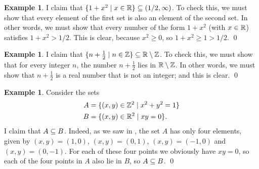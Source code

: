 \documentclass[a4paper]{book}
\theoremstyle{definition}
\newtheorem{example}[theorem]{Example}
\begin{document}
\begin{example}
 I claim that $\{1+x^2\;|\; x\in{\mathbb{R}}\}\subseteq(1/2,\infty)$.  To check this,
 we must show that every element of the first set is also an element
 of the second set.  In other words, we must show that every number of
 the form $1+x^2$ (with $x\in{\mathbb{R}}$) satisfies $1+x^2>1/2$.  This is
 clear, because $x^2\geq 0$, so $1+x^2\geq 1>1/2$.  \qed
\end{example}
\begin{example}
 I claim that $\{n+\frac{1}{2}\;|\; n\in{\mathbb{Z}}\}\subseteq{\mathbb{R}}\setminus{\mathbb{Z}}$.  To check
 this, we must show that for every integer $n$, the number
 $n+\frac{1}{2}$ lies in ${\mathbb{R}}\setminus{\mathbb{Z}}$.  In other words, we must show that
 $n+\frac{1}{2}$ is a real number that is not an integer; and this is
 clear. \qed
\end{example}
\begin{example}
 Consider the sets
 \begin{align*}
  A &= \{(x,y)\in{\mathbb{Z}}^2\;|\; x^2+y^2=1\} \\
  B &= \{(x,y)\in{\mathbb{R}}^2\;|\; xy=0\}.
 \end{align*}
 I claim that $A\subseteq B$.  Indeed, as we saw in
 , the set $A$ has only four elements, given
 by $(x,y)=(1,0)$, $(x,y)=(0,1)$, $(x,y)=(-1,0)$ and $(x,y)=(0,-1)$.
 For each of these four points we obviously have $xy=0$, so each of
 the four points in $A$ also lie in $B$, so $A\subseteq B$. \qed
\end{example}
\end{document}
